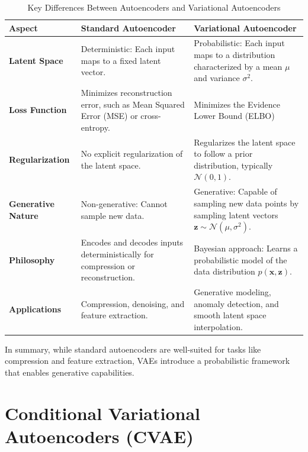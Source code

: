 \documentclass[a4paper,12pt]{article}
\begin{document}
\begin{table}[H]
\centering
\small
\renewcommand{\arraystretch}{1.6} %
\setlength{\tabcolsep}{12pt} %
\label{tab:ae_vs_vae}
\begin{tabular}{|p{}||p{}|p{}|}
\hline
 \textbf{Aspect} & \textbf{Standard Autoencoder} & \textbf{Variational Autoencoder} \\ \hline

\textbf{Latent Space} & Deterministic: Each input maps to a fixed latent vector. & Probabilistic: Each input maps to a distribution characterized by a mean \( \mu \) and variance \( \sigma^2 \). \\ \hline

 \textbf{Loss Function} & Minimizes reconstruction error, such as Mean Squared Error (MSE) or cross-entropy. & Minimizes the Evidence Lower Bound (ELBO) \\ \hline

\textbf{Regularization} & No explicit regularization of the latent space. & Regularizes the latent space to follow a prior distribution, typically \( \mathcal{N}(0, 1) \). \\ \hline

 \textbf{Generative Nature} & Non-generative: Cannot sample new data. & Generative: Capable of sampling new data points by sampling latent vectors \( \mathbf{z} \sim \mathcal{N}(\mu, \sigma^2) \). \\ \hline

\textbf{Philosophy} & Encodes and decodes inputs deterministically for compression or reconstruction. & Bayesian approach: Learns a probabilistic model of the data distribution \( p(\mathbf{x}, \mathbf{z}) \). \\ \hline

 \textbf{Applications} & Compression, denoising, and feature extraction. & Generative modeling, anomaly detection, and smooth latent space interpolation. \\ \hline
\end{tabular}
\caption{Key Differences Between Autoencoders and Variational Autoencoders}
\end{table}

In summary, while standard autoencoders are well-suited for tasks like compression and feature extraction, VAEs introduce a probabilistic framework that enables generative capabilities.

\section{Conditional Variational Autoencoders (CVAE)}
\end{document}
